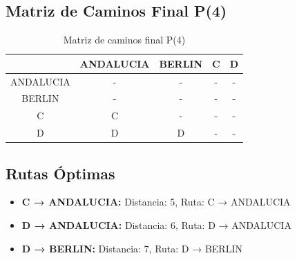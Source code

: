 \documentclass[12pt]{article}
\begin{document}
\clearpage
\subsection{Matriz de Caminos Final P(4)}
\begin{table}[h!]
\centering
\begin{tabular}{|c|c|c|c|c|}
\hline
 & ANDALUCIA & BERLIN & C & D \\\hline
ANDALUCIA & - & - & - & - \\\hline
BERLIN & - & - & - & - \\\hline
C & C & - & - & - \\\hline
D & D & D & - & - \\\hline
\end{tabular}
\caption{Matriz de caminos final P(4)}
\end{table}

\clearpage
\subsection{Rutas Óptimas}
\begin{itemize}
\item \textbf{C → ANDALUCIA:} Distancia: 5, Ruta: C → ANDALUCIA
\item \textbf{D → ANDALUCIA:} Distancia: 6, Ruta: D → ANDALUCIA
\item \textbf{D → BERLIN:} Distancia: 7, Ruta: D → BERLIN
\end{itemize}
\end{document}
